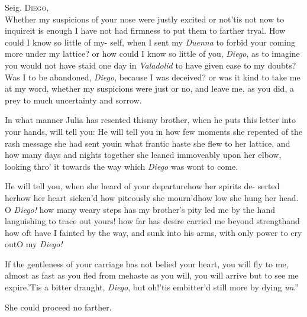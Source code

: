 \documentclass[twoside]{article}
\begin{document}
\indent\quad Seig. \textsc{Diego},\\
\indent\lqq Whether my suspicions of your nose\break
\lqq were justly excited or not\tsk ’tis not now\break
\lqq to inquire\tsk it is enough I have not\break
\lqq had firmness to put them to farther\break
\lqq tryal.\break
\break
\indent\lqq How could I know so little of my-\break
\lqq self, when I sent my \textit{Duenna} to forbid\break
\lqq your coming more under my lattice?\break
\lqq or how could I know so little of you,\break
\lqq \textit{Diego}, as to imagine you would not\break
\lqq have staid one day in \textit{Valadolid} to have\break
\lqq given ease to my doubts?\tsk Was I to\break
\lqq be abandoned, \textit{Diego}, because I was\break
\lqq deceived? or was it kind to take me\break
\lqq at my word, whether my suspicions\break
\lqq were just or no, and leave me, as you\break
\lqq did, a prey to much uncertainty and\break
\lqq sorrow.

\indent\lqq In what manner Julia has resented\break
\lqq this\tsk my brother, when he puts this\break
\lqq letter into your hands, will tell you:\break
\lqq He will tell you in how few moments\break
\lqq she repented of the rash message she\break
\lqq had sent you\tsk in what frantic haste\break
\lqq she flew to her lattice, and how many\break
\lqq days and nights together she leaned\break
\lqq immoveably upon her elbow, looking\break
\lqq thro’ it towards the way which \textit{Diego}\break
\lqq was wont to come.\hfill

\indent\lqq He will tell you, when she heard\break
\lqq of your departure\tsk how her spirits de-\break
\lqq serted her\tsk how her heart sicken’d\tsk\break
\lqq how piteously she mourn’d\tsh how low\break
\lqq she hung her head. O \textit{Diego!} how\break
\lqq many weary steps has my brother’s\break
\lqq pity led me by the hand languishing\break
\lqq to trace out yours! how far has desire\break
\lqq carried me beyond strength\tsh and how
\lqq oft have I fainted by the way, and\break
\lqq sunk into his arms, with only power\break
\lqq to cry out\tsk O my \textit{Diego!}

\indent\lqq If the gentleness of your carriage\break
\lqq has not belied your heart, you will fly\break
\lqq to me, almost as fast as you fled from\break
\lqq me\tsk haste as you will, you will arrive\break
\lqq but to see me expire.\tsk ’Tis a bitter\break
\lqq draught, \textit{Diego}, but oh!\@ ’tis embitter’d\break
\lqq still more by dying \textit{un}\tsh.”

She could proceed no farther.
\end{document}
